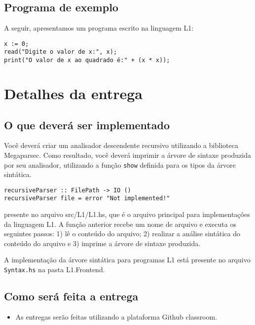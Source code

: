 \documentclass[a4paper,11pt]{article}
\begin{document}
\subsection*{Programa de exemplo}
\label{sec:orgd143d65}

A seguir, apresentamos um programa escrito na linguagem L1:

\begin{verbatim}
x := 0;
read("Digite o valor de x:", x);
print("O valor de x ao quadrado é:" + (x * x));
\end{verbatim}
\section*{Detalhes da entrega}
\label{sec:orgddd5227}

\subsection*{O que deverá ser implementado}
\label{sec:org893ffc1}

Você deverá criar um analisador descendente recursivo utilizando 
a biblioteca Megaparsec. Como resultado, você deverá imprimir a 
árvore de sintaxe produzida por seu analisador, utilizando a função 
\texttt{show} definida para os tipos da árvore sintática.

\begin{verbatim}
recursiveParser :: FilePath -> IO ()
recursiveParser file = error "Not implemented!"
\end{verbatim}

presente no arquivo src/L1/L1.hs, que é o arquivo principal para implementações da linguagem L1. 
A função anterior recebe um nome de arquivo e executa os seguintes passos: 1) lê o conteúdo do arquivo; 2) realizar a análise sintática do conteúdo do arquivo e 3) imprime a árvore de sintaxe produzida.

A implementação da árvore sintática para programas L1 está presente no arquivo \texttt{Syntax.hs}
na pasta L1.Frontend.
\subsection*{Como será feita a entrega}
\label{sec:orgd3ec5a9}

\begin{itemize}
\item As entregas serão feitas utilizando a plataforma Github classroom.
\end{itemize}
\end{document}
